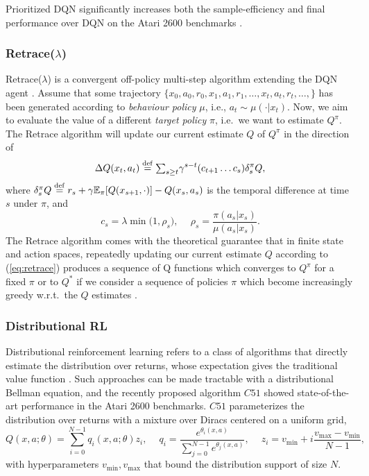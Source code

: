 \documentclass{article}
\newcommand{\beq}{\begin{equation}}
\newcommand{\eeq}{\end{equation}}
\newcommand{\beqa}{\begin{eqnarray}}
\newcommand{\eeqa}{\end{eqnarray}}
\newcommand{\E}{{\mathbb E}}
\newcommand{\eqdef}{\stackrel{\rm def}{=}}
\begin{document}
Prioritized DQN significantly increases both the sample-efficiency and final 
performance over DQN on the Atari 2600 benchmarks \citep{schaul2015prioritized}.

\subsubsection{Retrace($\lambda$)}\label{sec:retrace}
Retrace($\lambda$) is a convergent off-policy multi-step algorithm extending the 
DQN agent \citep{munos2016safe}. Assume that some trajectory $\{x_0, a_0, r_0, x_1, a_1, 
r_1, \dots, x_t, a_t, r_t, \dots, \}$ has been generated according to {\em 
behaviour policy} $\mu$, i.e., $a_t\sim \mu(\cdot|x_t)$. Now, we aim to 
evaluate the value of a different {\em target policy} $\pi$, i.e.~we want to 
estimate 
$Q^{\pi}$. The Retrace algorithm will update our current estimate $Q$ of 
$Q^{\pi}$ in the direction of
\beqa\label{eq:retrace}
\Delta Q(x_t, a_t)\eqdef {\textstyle \sum_{s\geq t}} \gamma^{s-t} (c_{t+1}\dots 
c_s) 
\delta^{\pi}_s Q ,
\eeqa
where $\delta^{\pi}_s Q \eqdef  r_s+\gamma \E_{\pi} [Q(x_{s+1},\cdot)] - 
Q(x_s,a_s)$ is the temporal difference at time $s$ under $\pi$, 
and 
\beq \label{eq:trace.cut}
c_s=\lambda\min\big(1,\rho_s\big),\ \quad \rho_s = 
\frac{\pi(a_s|x_s)}{\mu(a_s|x_s)}.
\eeq 
The Retrace algorithm comes with the theoretical guarantee that in finite state 
and action spaces, repeatedly updating our current estimate $Q$ according to 
(\ref{eq:retrace}) produces a sequence of Q functions which converges to 
$Q^{\pi}$ for a fixed 
$\pi$ or to $Q^*$ if we consider a sequence of policies $\pi$ which become 
increasingly greedy w.r.t.~the $Q$ estimates \citep{munos2016safe}.

\subsubsection{Distributional RL}\label{sec:distrl}
Distributional reinforcement learning refers to a class of algorithms that 
directly estimate the distribution over returns, 
whose expectation gives the traditional value function 
\citep{bellemare2017distributional}. Such approaches can be made 
tractable with a distributional Bellman equation, and the recently proposed 
algorithm $C51$ showed state-of-the-art performance 
in the Atari 2600 benchmarks. $C51$ parameterizes the distribution over returns 
with a mixture over Diracs centered on a uniform grid,
\begin{equation}
Q(x, a; \theta) = \sum_{i=0}^{N-1} q_i(x, a; \theta) z_i,\ \quad q_i = 
\frac{e^{\theta_i(x, a)}}{\sum_{j=0}^{N-1} e^{\theta_j(x, a)}},\ \quad z_i = v_{\min} + i 
\frac{v_{\max} - v_{\min}}{N-1},
\end{equation}
with hyperparameters $v_{\min} , v_{\max}$ that bound the distribution support of size $N$.
\end{document}

